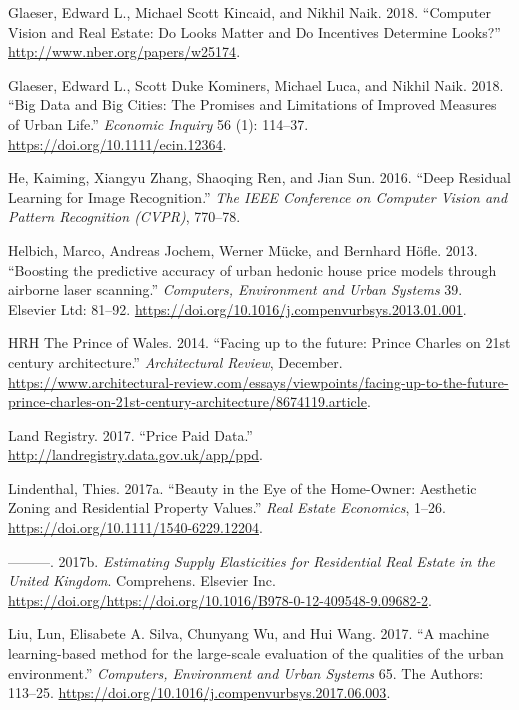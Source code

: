\documentclass[]{article}
\begin{document}
\leavevmode\hypertarget{ref-GlaeserKincaidNaik2018}{}%
Glaeser, Edward L., Michael Scott Kincaid, and Nikhil Naik. 2018.
``Computer Vision and Real Estate: Do Looks Matter and Do Incentives
Determine Looks?'' \url{http://www.nber.org/papers/w25174}.

\leavevmode\hypertarget{ref-Glaeser2016}{}%
Glaeser, Edward L., Scott Duke Kominers, Michael Luca, and Nikhil Naik.
2018. ``Big Data and Big Cities: The Promises and Limitations of
Improved Measures of Urban Life.'' \emph{Economic Inquiry} 56 (1):
114--37. \url{https://doi.org/10.1111/ecin.12364}.

\leavevmode\hypertarget{ref-He2016}{}%
He, Kaiming, Xiangyu Zhang, Shaoqing Ren, and Jian Sun. 2016. ``Deep
Residual Learning for Image Recognition.'' \emph{The IEEE Conference on
Computer Vision and Pattern Recognition (CVPR)}, 770--78.

\leavevmode\hypertarget{ref-Helbich2013}{}%
Helbich, Marco, Andreas Jochem, Werner Mücke, and Bernhard Höfle. 2013.
``Boosting the predictive accuracy of urban hedonic house price models
through airborne laser scanning.'' \emph{Computers, Environment and
Urban Systems} 39. Elsevier Ltd: 81--92.
\url{https://doi.org/10.1016/j.compenvurbsys.2013.01.001}.

\leavevmode\hypertarget{ref-princecharles2014}{}%
HRH The Prince of Wales. 2014. ``Facing up to the future: Prince Charles
on 21st century architecture.'' \emph{Architectural Review}, December.
\url{https://www.architectural-review.com/essays/viewpoints/facing-up-to-the-future-prince-charles-on-21st-century-architecture/8674119.article}.

\leavevmode\hypertarget{ref-LandRegistry2016a}{}%
Land Registry. 2017. ``Price Paid Data.''
\url{http://landregistry.data.gov.uk/app/ppd}.

\leavevmode\hypertarget{ref-Lindenthal2017b}{}%
Lindenthal, Thies. 2017a. ``Beauty in the Eye of the Home-Owner:
Aesthetic Zoning and Residential Property Values.'' \emph{Real Estate
Economics}, 1--26. \url{https://doi.org/10.1111/1540-6229.12204}.

\leavevmode\hypertarget{ref-Lindenthal2017}{}%
---------. 2017b. \emph{Estimating Supply Elasticities for Residential
Real Estate in the United Kingdom}. Comprehens. Elsevier Inc.
\url{https://doi.org/https://doi.org/10.1016/B978-0-12-409548-9.09682-2}.

\leavevmode\hypertarget{ref-Liu2017}{}%
Liu, Lun, Elisabete A. Silva, Chunyang Wu, and Hui Wang. 2017. ``A
machine learning-based method for the large-scale evaluation of the
qualities of the urban environment.'' \emph{Computers, Environment and
Urban Systems} 65. The Authors: 113--25.
\url{https://doi.org/10.1016/j.compenvurbsys.2017.06.003}.
\end{document}
